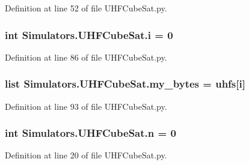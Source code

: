 Definition at line 52 of file U\+H\+F\+Cube\+Sat.\+py.

\hypertarget{namespace_simulators_1_1_u_h_f_cube_sat_a58cd206e7df089544d2a4c9ed6e0396b}{}
\subsubsection[{i}]{\setlength{\rightskip}{0pt plus 5cm}int Simulators.\+U\+H\+F\+Cube\+Sat.\+i = 0}\label{namespace_simulators_1_1_u_h_f_cube_sat_a58cd206e7df089544d2a4c9ed6e0396b}


Definition at line 86 of file U\+H\+F\+Cube\+Sat.\+py.

\hypertarget{namespace_simulators_1_1_u_h_f_cube_sat_a6103aa3fd4ff07b067933dfecee3c073}{}
\subsubsection[{my\+\_\+bytes}]{\setlength{\rightskip}{0pt plus 5cm}list Simulators.\+U\+H\+F\+Cube\+Sat.\+my\+\_\+bytes = {\bf uhfs}\mbox{[}{\bf i}\mbox{]}}\label{namespace_simulators_1_1_u_h_f_cube_sat_a6103aa3fd4ff07b067933dfecee3c073}


Definition at line 93 of file U\+H\+F\+Cube\+Sat.\+py.

\hypertarget{namespace_simulators_1_1_u_h_f_cube_sat_aa8de796a9f89196f896ed5855b3a8ce4}{}
\subsubsection[{n}]{\setlength{\rightskip}{0pt plus 5cm}int Simulators.\+U\+H\+F\+Cube\+Sat.\+n = 0}\label{namespace_simulators_1_1_u_h_f_cube_sat_aa8de796a9f89196f896ed5855b3a8ce4}


Definition at line 20 of file U\+H\+F\+Cube\+Sat.\+py.

\hypertarget{namespace_simulators_1_1_u_h_f_cube_sat_a8061636f761f08164b8ca45c2ef477a8}{}
